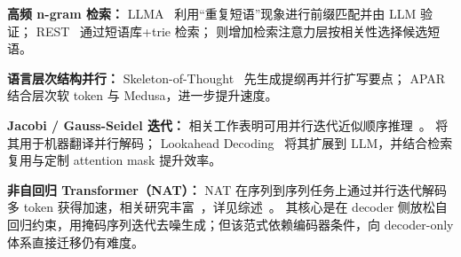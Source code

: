 \textbf{高频 n-gram 检索：}
LLMA~\cite{yang2023inference} 利用“重复短语”现象进行前缀匹配并由 LLM 验证；
REST~\cite{he2023rest} 通过短语库+trie 检索；
\cite{lan2023copy} 则增加检索注意力层按相关性选择候选短语。

\textbf{语言层次结构并行：}
Skeleton-of-Thought~\cite{ning2023skeletonofthought} 先生成提纲再并行扩写要点；
APAR~\cite{liu2024apar} 结合层次软 token 与 Medusa，进一步提升速度。

\textbf{Jacobi / Gauss-Seidel 迭代：}
相关工作表明可用并行迭代近似顺序推理~\cite{pmlr-v139-song21a,ortega2000iterative}。
\cite{santilli2023accelerating} 将其用于机器翻译并行解码；
Lookahead Decoding~\cite{fu2023lookahead} 将其扩展到 LLM，并结合检索复用与定制 attention mask 提升效率。

\textbf{非自回归 Transformer（NAT）：}
NAT 在序列到序列任务上通过并行迭代解码多 token 获得加速，相关研究丰富~\cite{gu2017non,wang2019non,li2019hint,sun2019fast,wei2019imitation,shao2020minimizing,lee2018deterministic,ghazvininejad2019maskpredict,guo-etal-2020-jointly,gu2020fully,savinov2021step}，详见综述~\cite{xiao2023survey}。
其核心是在 decoder 侧放松自回归约束，用掩码序列迭代去噪生成；但该范式依赖编码器条件，向 decoder-only 体系直接迁移仍有难度。
